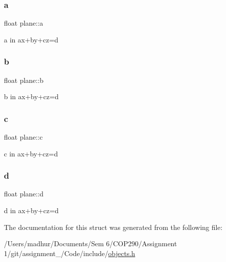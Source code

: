 \subsubsection{\texorpdfstring{a}{a}}
{\footnotesize\ttfamily float plane\+::a}



a in ax+by+cz=d 

\mbox{\label{structplane_af4a97d4328067448317dd787e048bc70}} 
\subsubsection{\texorpdfstring{b}{b}}
{\footnotesize\ttfamily float plane\+::b}



b in ax+by+cz=d 

\mbox{\label{structplane_a3024e149a5b2cb4697fa71ae7d539bd1}} 
\subsubsection{\texorpdfstring{c}{c}}
{\footnotesize\ttfamily float plane\+::c}



c in ax+by+cz=d 

\mbox{\label{structplane_a9a3cb65698785bad8199e7afbd083e27}} 
\subsubsection{\texorpdfstring{d}{d}}
{\footnotesize\ttfamily float plane\+::d}



d in ax+by+cz=d 



The documentation for this struct was generated from the following file\+:\begin{DoxyCompactItemize}
\item 
/\+Users/madhur/\+Documents/\+Sem 6/\+C\+O\+P290/\+Assignment 1/git/assignment\+\_/\+Code/include/\mbox{\hyperlink{objects_8h}{objects.\+h}}\end{DoxyCompactItemize}
